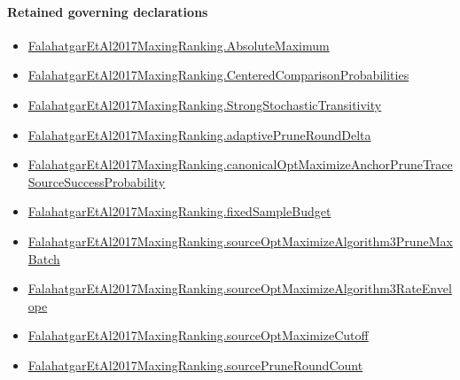\documentclass[10pt]{article}
\begin{document}
\paragraph{Retained governing declarations}
\begin{itemize}\raggedright
\item \hyperlink{paper-prerequisite-9c0d6111ba7505a4}{Falahatgar\allowbreak{}Et\allowbreak{}Al2017\allowbreak{}Maxing\allowbreak{}Ranking.\allowbreak{}Absolute\allowbreak{}Maximum}
\item \hyperlink{paper-prerequisite-b99b697ef57f53ce}{Falahatgar\allowbreak{}Et\allowbreak{}Al2017\allowbreak{}Maxing\allowbreak{}Ranking.\allowbreak{}Centered\allowbreak{}Comparison\allowbreak{}Probabilities}
\item \hyperlink{paper-prerequisite-76807884cf8ad345}{Falahatgar\allowbreak{}Et\allowbreak{}Al2017\allowbreak{}Maxing\allowbreak{}Ranking.\allowbreak{}Strong\allowbreak{}Stochastic\allowbreak{}Transitivity}
\item \hyperlink{governing-declaration-0a2d9c4ad2e46f08}{Falahatgar\allowbreak{}Et\allowbreak{}Al2017\allowbreak{}Maxing\allowbreak{}Ranking.\allowbreak{}adaptive\allowbreak{}Prune\allowbreak{}Round\allowbreak{}Delta}
\item \hyperlink{governing-declaration-19063a8bc55fd773}{Falahatgar\allowbreak{}Et\allowbreak{}Al2017\allowbreak{}Maxing\allowbreak{}Ranking.\allowbreak{}canonical\allowbreak{}Opt\allowbreak{}Maximize\allowbreak{}Anchor\allowbreak{}Prune\allowbreak{}Trace\allowbreak{}Source\allowbreak{}Success\allowbreak{}Probability}
\item \hyperlink{governing-declaration-4b4daf4bb2493573}{Falahatgar\allowbreak{}Et\allowbreak{}Al2017\allowbreak{}Maxing\allowbreak{}Ranking.\allowbreak{}fixed\allowbreak{}Sample\allowbreak{}Budget}
\item \hyperlink{governing-declaration-0a860a2e672923f2}{Falahatgar\allowbreak{}Et\allowbreak{}Al2017\allowbreak{}Maxing\allowbreak{}Ranking.\allowbreak{}source\allowbreak{}Opt\allowbreak{}Maximize\allowbreak{}Algorithm3\allowbreak{}Prune\allowbreak{}Max\allowbreak{}Batch}
\item \hyperlink{governing-declaration-ab55890b79edc807}{Falahatgar\allowbreak{}Et\allowbreak{}Al2017\allowbreak{}Maxing\allowbreak{}Ranking.\allowbreak{}source\allowbreak{}Opt\allowbreak{}Maximize\allowbreak{}Algorithm3\allowbreak{}Rate\allowbreak{}Envelope}
\item \hyperlink{paper-prerequisite-9ce008c647235873}{Falahatgar\allowbreak{}Et\allowbreak{}Al2017\allowbreak{}Maxing\allowbreak{}Ranking.\allowbreak{}source\allowbreak{}Opt\allowbreak{}Maximize\allowbreak{}Cutoff}
\item \hyperlink{governing-declaration-7a4a97da03826b66}{Falahatgar\allowbreak{}Et\allowbreak{}Al2017\allowbreak{}Maxing\allowbreak{}Ranking.\allowbreak{}source\allowbreak{}Prune\allowbreak{}Round\allowbreak{}Count}
\end{itemize}
\end{document}

